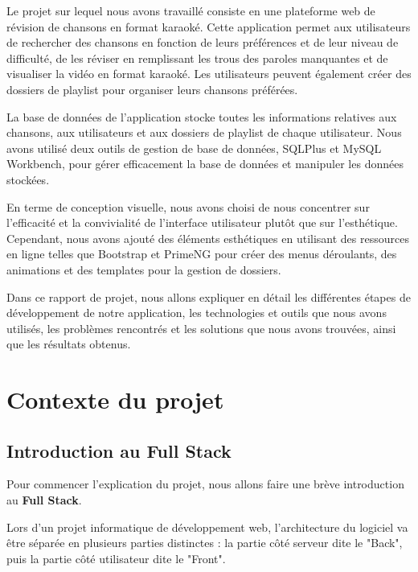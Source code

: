 \documentclass[12pt,french]{article}
\begin{document}
Le projet sur lequel nous avons travaillé consiste en une plateforme web de révision de chansons en format karaoké. Cette application permet aux utilisateurs de rechercher des chansons en fonction de leurs préférences et de leur niveau de difficulté, de les réviser en remplissant les trous des paroles manquantes et de visualiser la vidéo en format karaoké. Les utilisateurs peuvent également créer des dossiers de playlist pour organiser leurs chansons préférées.

\medskip

La base de données de l'application stocke toutes les informations relatives aux chansons, aux utilisateurs et aux dossiers de playlist de chaque utilisateur. Nous avons utilisé deux outils de gestion de base de données, SQLPlus et MySQL Workbench, pour gérer efficacement la base de données et manipuler les données stockées.

\medskip

En terme de conception visuelle, nous avons choisi de nous concentrer sur l'efficacité et la convivialité de l'interface utilisateur plutôt que sur l'esthétique. Cependant, nous avons ajouté des éléments esthétiques en utilisant des ressources en ligne telles que Bootstrap et PrimeNG pour créer des menus déroulants, des animations et des templates pour la gestion de dossiers.

\medskip

Dans ce rapport de projet, nous allons expliquer en détail les différentes étapes de développement de notre application, les technologies et outils que nous avons utilisés, les problèmes rencontrés et les solutions que nous avons trouvées, ainsi que les résultats obtenus.


\section{Contexte du projet}

\subsection{Introduction au Full Stack}

Pour commencer l'explication du projet, nous allons faire une brève introduction au \textbf{Full Stack}.

\medskip

Lors d'un projet informatique de développement web, l'architecture du logiciel va être séparée en plusieurs parties distinctes : la partie côté serveur dite le "\gls{Back}", puis la partie côté utilisateur dite le "\gls{Front}".
\end{document}
